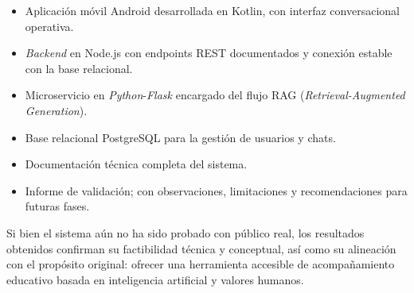 \begin{itemize}
      \item Aplicación móvil Android desarrollada en Kotlin, con interfaz conversacional
            operativa.
      \item \textit{Backend} en Node.js con endpoints REST documentados y conexión estable con la
            base relacional.
      \item Microservicio en \textit{Python}-\textit{Flask} encargado del flujo RAG
            (\textit{Retrieval-Augmented Generation}).
      \item Base relacional PostgreSQL para la gestión de usuarios y chats.
      \item Documentación técnica completa del sistema.
      \item Informe de validación; con observaciones, limitaciones y
            recomendaciones para futuras fases.
\end{itemize}

Si bien el sistema aún no ha sido probado con público real, los resultados
obtenidos confirman su factibilidad técnica y conceptual, así como su
alineación con el propósito original: ofrecer una herramienta accesible de
acompañamiento educativo basada en inteligencia artificial y valores humanos.